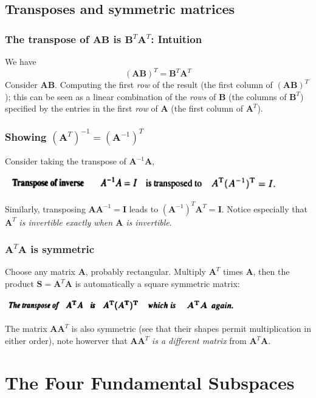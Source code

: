 \documentclass{report}
\begin{document}
\section{Transposes and symmetric matrices}
\subsection{The transpose of $\bm{AB}$ is $\bm B^T\bm A^T$: Intuition}
We have
\begin{equation*}
(\bm{AB})^T=\bm B^T\bm A^T
\end{equation*}
Consider $\bm{AB}$. Computing the first \textit{row} of the result (the first column of $(\bm{AB})^T$); this can be seen as a linear combination of the 
\textit{rows} of $\bm B$ (the columns of $\bm B^T$) specified by the entries
in the first \textit{row} of $\bm A$ (the first column of $\bm A^T$).
\subsection{Showing $(\bm A^T)^{-1}=(\bm A^{-1})^T$}
Consider taking the transpose of $\bm A^{-1}\bm A$,
\begin{center}
\includegraphics[width=12cm]{20}
\end{center}
Similarly, transposing $\bm{AA}^{-1}=\bm I$ leads to $({\bm A}^{-1})^T\bm A^T=\bm I$. Notice especially that $\bm A^T$ \textit{is invertible exactly when $\bm A$ is 
invertible}.
\subsection{$\bm A^T\bm A$ is symmetric}
Choose any matrix $\bm A$, probably rectangular. Multiply $\bm A^T$ times $\bm A$, then the product $\bm S=\bm A^T\bm A$ is automatically a square symmetric matrix:
\begin{center}
\includegraphics[width=10cm]{21}
\end{center}
The matrix $\bm{AA}^T$ is also symmetric (see that their shapes permit multiplication in either order), note howerver that $\bm{AA}^T$ \textit{is a different matrix} 
from $\bm A^T\bm A$.
\newpage

\chapter{The Four Fundamental Subspaces}
\end{document}
